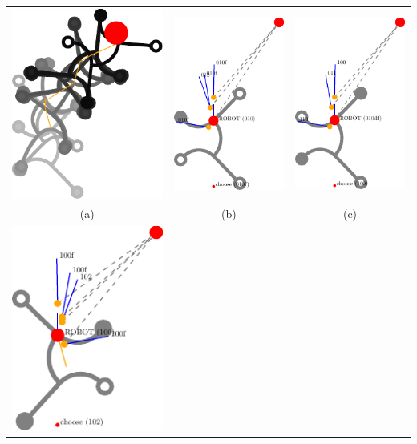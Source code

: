 \documentclass[10pt,a4paper]{article}
\begin{document}
\begin{tabular}{ccc}
\includegraphics[width=.3\textwidth]{pics/pathplanner_without_noise/example_curve/gait.pdf}
&
\includegraphics[width=.3\textwidth]{pics/pathplanner_without_noise/example_curve/dec_0.pdf}
&
\includegraphics[width=.3\textwidth]{pics/pathplanner_without_noise/example_curve/dec_2.pdf}
\\
(a) & (b) & (c)
\\
\includegraphics[width=.3\textwidth]{pics/pathplanner_without_noise/example_curve/dec_3.pdf}

\end{tabular}
\end{document}
